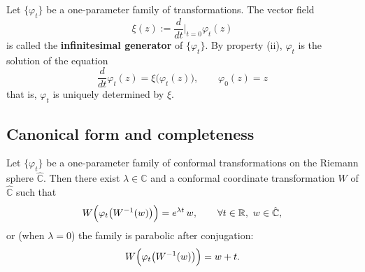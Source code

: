 \begin{definition}\label{def:infinitesimal_generator}
Let $\{\varphi_t\}$ be a one-parameter family of transformations. The vector field
\[
\xi(z):=\frac{d}{dt}\Big|_{t=0}\varphi_t(z)
\]
is called the \textbf{infinitesimal generator} of $\{\varphi_t\}$. By property (ii), $\varphi_t$ is the solution of the equation
\[
\frac{d}{dt}\varphi_t(z)=\xi\bigl(\varphi_t(z)\bigr),\qquad \varphi_0(z)=z
\]
that is, $\varphi_t$ is uniquely determined by $\xi$.
\end{definition}

\subsection{Canonical form and completeness}

\begin{theorem}\label{thm:canonical_form}
Let $\{\varphi_t\}$ be a one-parameter family of conformal transformations on the Riemann sphere $\hat{\mathbb C}$. Then there exist $\lambda\in\mathbb C$ and a conformal coordinate transformation $W$ of $\hat{\mathbb C}$ such that
\[
W\Bigl(\varphi_t\bigl(W^{-1}(w)\bigr)\Bigr)=e^{\lambda t}\,w,\qquad \forall t\in\mathbb R,\ w\in\hat{\mathbb C},
\]
or (when $\lambda=0$) the family is parabolic after conjugation:
\[
W\Bigl(\varphi_t\bigl(W^{-1}(w)\bigr)\Bigr)=w+t .
\]
\end{theorem}

